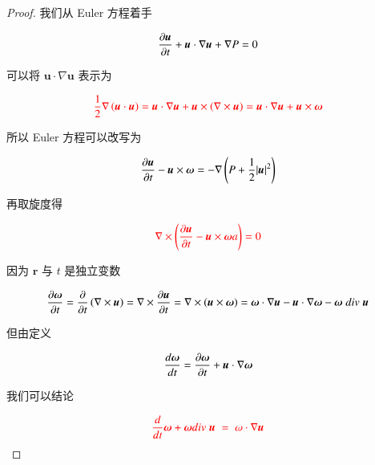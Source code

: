 \documentclass[11pt]{article}
\begin{document}
\begin{proof}
	
	\kaishu 
	
	我们从 Euler 方程着手
	
	\begin{equation}
	\frac{{\partial \boldsymbol{u}}}{{\partial t}} + \boldsymbol{u} \cdot \nabla \boldsymbol{u} + \nabla P = 0
	\notag 
	\end{equation}
	
	可以将 $ \boldsymbol{u} \cdot  \nabla \boldsymbol{u} $ 表示为
	
	\begin{equation}
	\color{red}
	\frac{1}{2}\nabla \left( {\boldsymbol{u} \cdot \boldsymbol{u}} \right) = \boldsymbol{u} \cdot \nabla \boldsymbol{u} + \boldsymbol{u} \times \left( {\nabla  \times \boldsymbol{u}} \right) = \boldsymbol{u} \cdot \nabla \boldsymbol{u} + \boldsymbol{u} \times \boldsymbol{\omega} 
	\notag 
	\end{equation}
	
	所以 Euler 方程可以改写为
	
	\begin{equation}
	\frac{{\partial \boldsymbol{u}}}{{\partial t}} - \boldsymbol{u} \times \boldsymbol{\omega}  =  - \nabla \left( {P + \frac{1}{2}{{\left| \boldsymbol{u} \right|}^2}} \right)
	\notag 
	\end{equation}
	
	再取旋度得
	
	\begin{equation}
	\color{red}
	\nabla  \times \left( {\frac{{\partial \boldsymbol{u}}}{{\partial t}} - \boldsymbol{u} \times \boldsymbol{\omega}a } \right) = 0
	\notag 
	\end{equation}
	
	因为 $ \boldsymbol{r} $ 与 $ t $ 是独立变数
	
	\begin{equation}
	\frac{{\partial \boldsymbol{\omega} }}{{\partial t}} = \frac{\partial }{{\partial t}}\left( {\nabla  \times \boldsymbol{u}} \right) = \nabla  \times \frac{{\partial \boldsymbol{u}}}{{\partial t}} = \nabla  \times \left( {\boldsymbol{u} \times \boldsymbol{\omega} } \right) = \boldsymbol{\omega}  \cdot \nabla \boldsymbol{u} - \boldsymbol{u} \cdot \nabla \boldsymbol{\omega}  - \boldsymbol{\omega} \;div\;\boldsymbol{u}
	\notag 
	\end{equation}
	
	但由定义
	
	\begin{equation}
	\frac{{d\boldsymbol{\omega} }}{{dt}} = \frac{{\partial \boldsymbol{\omega} }}{{\partial t}} + \boldsymbol{u} \cdot \nabla \boldsymbol{\omega} 
	\notag 
	\end{equation}
	
	我们可以结论
	
	\begin{equation}
	\color{red}
	\frac{d}{{dt}}\boldsymbol{\omega}  + \boldsymbol{\omega} div\;\boldsymbol{u}\; = \;\omega  \cdot \nabla \boldsymbol{u}
	\notag 
	\end{equation}
\end{proof}
\end{document}
